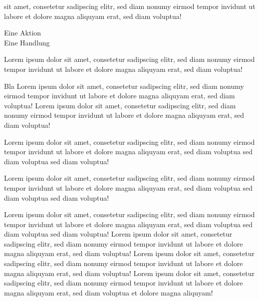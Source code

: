 \documentclass[
parindent=false,
parskip=true,
parts=true,
colortheme=wu,
styletheme=wu,
shownotess=true,
showresults=false
]{edu}
\begin{document}
 sit amet, consetetur sadipscing elitr, sed diam nonumy eirmod tempor invidunt ut labore et dolore magna aliquyam erat, sed diam voluptua!

\action Eine Aktion\\
\speech Eine Handlung


\newpage
Lorem ipsum dolor sit amet, consetetur sadipscing elitr, sed diam nonumy eirmod tempor invidunt ut labore et dolore magna aliquyam erat, sed diam voluptua! 

\begin{cols}[4]
	Bla Lorem ipsum dolor sit amet, consetetur sadipscing elitr, sed diam nonumy eirmod tempor invidunt ut labore et dolore magna aliquyam erat, sed diam voluptua! Lorem ipsum dolor sit amet, consetetur sadipscing elitr, sed diam nonumy eirmod tempor invidunt ut labore et dolore magna aliquyam erat, sed diam voluptua! 
  	
  	Lorem ipsum dolor sit amet, consetetur sadipscing elitr, sed diam nonumy eirmod tempor invidunt ut labore et dolore magna aliquyam erat, sed diam voluptua sed diam voluptua sed diam voluptua! 
    
  	
  	Lorem ipsum dolor sit amet, consetetur sadipscing elitr, sed diam nonumy eirmod tempor invidunt ut labore et dolore magna aliquyam erat, sed diam voluptua sed diam voluptua sed diam voluptua! 
    \colbreak
  	
  	Lorem ipsum dolor sit amet, consetetur sadipscing elitr, sed diam nonumy eirmod tempor invidunt ut labore et dolore magna aliquyam erat, sed diam voluptua sed diam voluptua sed diam voluptua! 
    \colbreak
    Lorem ipsum dolor sit amet, consetetur sadipscing elitr, sed diam nonumy eirmod tempor invidunt ut labore et dolore magna aliquyam erat, sed diam voluptua! 
    \colbreak
    Lorem ipsum dolor sit amet, consetetur sadipscing elitr, sed diam nonumy eirmod tempor invidunt ut labore et dolore magna aliquyam erat, sed diam voluptua! Lorem ipsum dolor sit amet, consetetur sadipscing elitr, sed diam nonumy eirmod tempor invidunt ut labore et dolore magna aliquyam erat, sed diam voluptua et dolore magna aliquyam! 
\end{cols}
\end{document}
